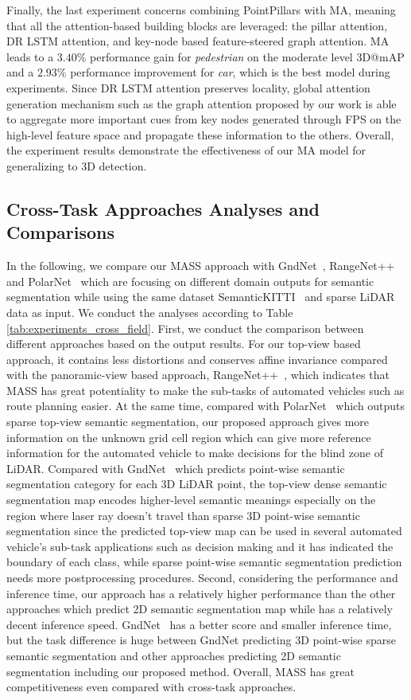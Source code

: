 \documentclass[lettersize,journal]{IEEEtran}
\begin{document}
Finally, the last experiment concerns combining PointPillars with MA, meaning that all the attention-based building blocks are leveraged: the pillar attention, DR LSTM attention, and key-node based feature-steered graph attention.
MA leads to a $3.40\%$ performance gain for \emph{pedestrian} on the moderate level 3D@mAP and a $2.93\%$ performance improvement for \emph{car}, which is the best model during experiments.
Since DR LSTM attention preserves locality, global attention generation mechanism such as the graph attention proposed by our work is able to aggregate more important cues from key nodes generated through FPS on the high-level feature space and propagate these information to the others. 
Overall, the experiment results demonstrate the effectiveness of our MA model for generalizing to 3D detection.
\subsection{Cross-Task Approaches Analyses and Comparisons}
In the following, we compare our MASS approach with GndNet~\cite{gndnet}, RangeNet++~\cite{rangenet++} and PolarNet~\cite{polarnet} which are focusing on different domain outputs for semantic segmentation while using the same dataset SemanticKITTI~\cite{semantic_kitti} and sparse LiDAR data as input. We conduct the analyses according to Table \ref{tab:experiments_cross_field}. First, we conduct the comparison between different approaches based on the output results. For our top-view based approach, it contains less distortions and conserves affine invariance compared with the panoramic-view based approach, RangeNet++~\cite{rangenet++}, which indicates that MASS has great potentiality to make the sub-tasks of automated vehicles such as route planning easier. At the same time, compared with PolarNet~\cite{pointnet} which outputs sparse top-view semantic segmentation, our proposed approach gives more information on the unknown grid cell region which can give more reference information for the automated vehicle to make decisions for the blind zone of LiDAR. Compared with GndNet~\cite{gndnet} which predicts point-wise semantic segmentation category for each 3D LiDAR point, the top-view dense semantic segmentation map encodes higher-level semantic meanings especially on the region where laser ray doesn't travel than sparse 3D point-wise semantic segmentation since the predicted top-view map can be used in several automated vehicle's sub-task applications such as decision making and it has indicated the boundary of each class, while sparse point-wise semantic segmentation prediction needs more postprocessing procedures. Second, considering the performance and inference time, our approach has a relatively higher performance than the other approaches which predict 2D semantic segmentation map while has a relatively decent inference speed. GndNet~\cite{gndnet} has a better score and smaller inference time, but the task difference is huge between GndNet predicting 3D point-wise sparse semantic segmentation and other approaches predicting 2D semantic segmentation including our proposed method. Overall, MASS has great competitiveness even compared with cross-task approaches.
\end{document}
